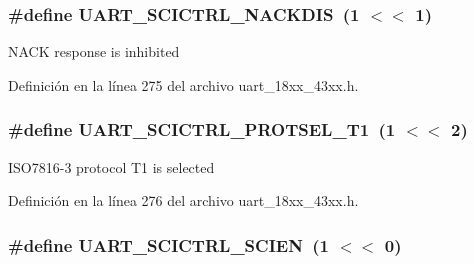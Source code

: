 \subsubsection[{\texorpdfstring{U\+A\+R\+T\+\_\+\+S\+C\+I\+C\+T\+R\+L\+\_\+\+N\+A\+C\+K\+D\+IS}{UART_SCICTRL_NACKDIS}}]{\setlength{\rightskip}{0pt plus 5cm}\#define U\+A\+R\+T\+\_\+\+S\+C\+I\+C\+T\+R\+L\+\_\+\+N\+A\+C\+K\+D\+IS~(1 $<$$<$ 1)}\hypertarget{group___u_a_r_t__18_x_x__43_x_x_ga49ad93a6f4c7175b6111716e329bfb36}{}\label{group___u_a_r_t__18_x_x__43_x_x_ga49ad93a6f4c7175b6111716e329bfb36}
N\+A\+CK response is inhibited 

Definición en la línea 275 del archivo uart\+\_\+18xx\+\_\+43xx.\+h.

\subsubsection[{\texorpdfstring{U\+A\+R\+T\+\_\+\+S\+C\+I\+C\+T\+R\+L\+\_\+\+P\+R\+O\+T\+S\+E\+L\+\_\+\+T1}{UART_SCICTRL_PROTSEL_T1}}]{\setlength{\rightskip}{0pt plus 5cm}\#define U\+A\+R\+T\+\_\+\+S\+C\+I\+C\+T\+R\+L\+\_\+\+P\+R\+O\+T\+S\+E\+L\+\_\+\+T1~(1 $<$$<$ 2)}\hypertarget{group___u_a_r_t__18_x_x__43_x_x_ga48e869912cabe85bef5d11cda3b773f4}{}\label{group___u_a_r_t__18_x_x__43_x_x_ga48e869912cabe85bef5d11cda3b773f4}
I\+S\+O7816-\/3 protocol T1 is selected 

Definición en la línea 276 del archivo uart\+\_\+18xx\+\_\+43xx.\+h.

\subsubsection[{\texorpdfstring{U\+A\+R\+T\+\_\+\+S\+C\+I\+C\+T\+R\+L\+\_\+\+S\+C\+I\+EN}{UART_SCICTRL_SCIEN}}]{\setlength{\rightskip}{0pt plus 5cm}\#define U\+A\+R\+T\+\_\+\+S\+C\+I\+C\+T\+R\+L\+\_\+\+S\+C\+I\+EN~(1 $<$$<$ 0)}\hypertarget{group___u_a_r_t__18_x_x__43_x_x_gac14d3bf09ef0b0956626afe3e0fcf83a}{}\label{group___u_a_r_t__18_x_x__43_x_x_gac14d3bf09ef0b0956626afe3e0fcf83a}


